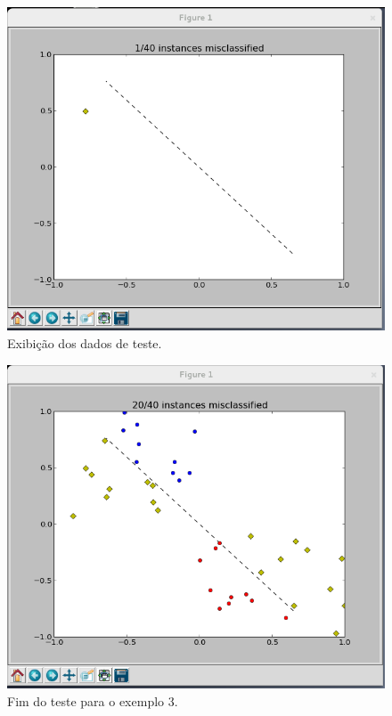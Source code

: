 \documentclass[brazil, a4paper]{article}
\begin{document}
\begin{description}
\newpage
\begin{figure}[!htb]
\centering
\includegraphics[scale=0.42]{ex3-t1.png}
\caption{Exibição dos dados de teste.}
\end{figure}

\begin{figure}[!htb]
\centering
\includegraphics[scale=0.42]{ex3-t2.png}
\caption{Fim do teste para o exemplo 3.}
\end{figure}



\end{description}
\end{document}
